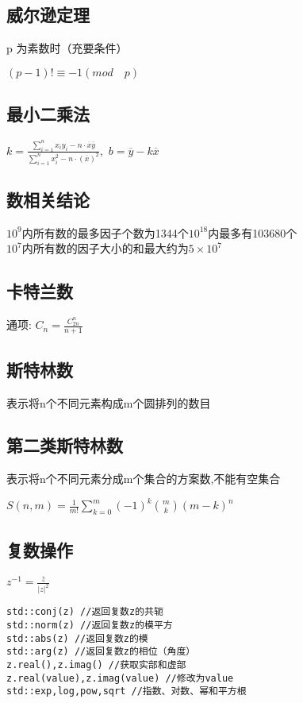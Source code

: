 \documentclass[twocolumn,a4]{article}
\begin{document}
\subsection{威尔逊定理}
p 为素数时（充要条件）\\
\begin{LARGE}
    $(p-1)!\equiv -1(mod\quad p)$
\end{LARGE}

\subsection{最小二乘法}
\begin{LARGE}
    $\displaystyle k=\frac{\sum_{i=1}^{n}x_{i}y_{i}-n\cdot\overline{x}\overline{y}}{\sum_{i=1}^{n}x_{i}^{2}-n\cdot (\overline{x})^{2}} ,$
    $b=\overline{y}-k\overline{x}$
\end{LARGE}

\subsection{数相关结论}
$10^{9}$内所有数的最多因子个数为1344个$10^{18}$内最多有103680个\\
$10^{7}$内所有数的因子大小的和最大约为$5\times 10^{7}$\\
\subsection{卡特兰数}
\begin{Large}
    通项: $C_n=\frac{C_{2n}^{n}}{n+1}$
\end{Large}

\subsection{斯特林数}
表示将n个不同元素构成m个圆排列的数目

\subsection{第二类斯特林数}
表示将n个不同元素分成m个集合的方案数,不能有空集合\\
\begin{large}
    $S(n,m)=\frac{1}{m!}\sum_{k=0}^{m}(-1)^{k}\binom{m}{k}(m-k)^{n} $
\end{large}

\subsection{复数操作}
\begin{LARGE}
    $z^{-1}=\frac{\overline{z} }{|z|^{2}}$
\end{LARGE}
\begin{lstlisting}
std::conj(z) //返回复数z的共轭
std::norm(z) //返回复数z的模平方
std::abs(z) //返回复数z的模
std::arg(z) //返回复数z的相位（角度）
z.real(),z.imag() //获取实部和虚部
z.real(value),z.imag(value) //修改为value
std::exp,log,pow,sqrt //指数、对数、幂和平方根
\end{lstlisting}
\end{document}
